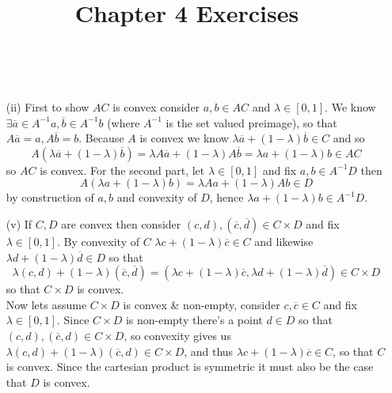 \documentclass{article}
\title{Chapter 4 Exercises}
\newenvironment{ex}[1]
  {\renewcommand\theexercise{#1}\exercise}
  {\endexercise}
\begin{document}
\begin{ex}{4.1} %
  \,\\
  \begin{itemize}
    \item[(ii)]
      \newcommand{\ab}{\overline{a}}
      \newcommand{\bb}{\overline{b}}
      First to show $AC$ is convex consider $a, b \in AC$ and $\lambda \in [0, 1]$. We know $\exists \ab \in A^{-1}a, \bb \in A^{-1}b$ (where $A^{-1}$ is the set valued preimage), so that $A\ab = a, A\bb = b$. Because $A$ is convex we know $\lambda \ab + (1-\lambda)\bb \in C$ and so
      $$
      A(\lambda\ab + (1-\lambda)\bb) = \lambda A\ab + (1-\lambda) A \bb = \lambda a + (1-\lambda) b \in AC
      $$
      so $AC$ is convex. For the second part, let $\lambda \in [0, 1]$ and fix $a, b \in A^{-1}D$ then 
      $$
      A(\lambda a + (1-\lambda) b) = \lambda Aa + (1-\lambda)Ab \in D
      $$
      by construction of $a, b$ and convexity of $D$, hence $\lambda a + (1-\lambda)b \in A^{-1}D$.
    \item[(v)]
      \newcommand{\cb}{\overline{c}}
      \newcommand{\db}{\overline{d}}
      If $C, D$ are convex then consider $(c, d), (\cb, \db) \in C \times D$ and fix $\lambda \in [0,1]$. By convexity of $C$ $\lambda c + (1-\lambda)\cb \in C$ and likewise $\lambda d + (1-\lambda)\db \in D$ so that
      $$
      \lambda (c, d) + (1-\lambda) (\cb, \db) = (\lambda c + (1-\lambda) \cb, \lambda d + (1-\lambda) \db) \in C \times D
      $$
      so that $C \times D$ is convex. \, \\

      Now lets assume $C \times D$ is convex \& non-empty, consider $c, \cb \in C$ and fix $\lambda \in [0, 1]$. Since $C \times D$ is non-empty there's a point $d \in D$ so that $(c, d), (\cb, d) \in C \times D$, so convexity gives us $\lambda (c, d) + (1-\lambda) (\cb, d) \in C \times D$, and thus $\lambda c + (1-\lambda) \cb \in C$, so that $C$ is convex. Since the cartesian product is symmetric it must also be the case that $D$ is convex. \, \\


\end{itemize}
\end{ex}
\end{document}
